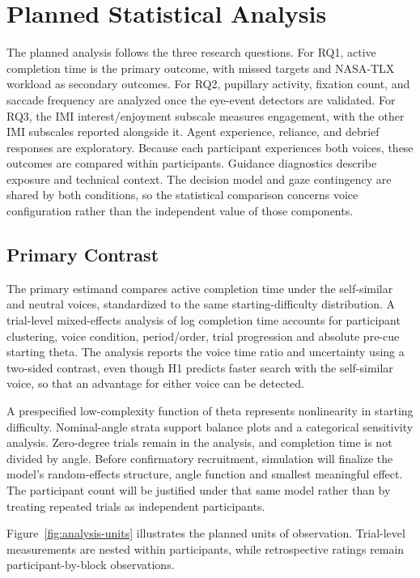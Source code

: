 
\section{Planned Statistical Analysis}
\label{ch:analysis}
The planned analysis follows the three research questions. For RQ1, active completion time is the primary outcome, with missed targets and NASA-TLX workload as secondary outcomes. For RQ2, pupillary activity, fixation count, and saccade frequency are analyzed once the eye-event detectors are validated. For RQ3, the IMI interest/enjoyment subscale measures engagement, with the other IMI subscales reported alongside it. Agent experience, reliance, and debrief responses are exploratory. Because each participant experiences both voices, these outcomes are compared within participants. Guidance diagnostics describe exposure and technical context. The decision model and gaze contingency are shared by both conditions, so the statistical comparison concerns voice configuration rather than the independent value of those components.

\subsection{Primary Contrast}
The primary estimand compares active completion time under the self-similar and neutral voices, standardized to the same starting-difficulty distribution. A trial-level mixed-effects analysis of log completion time accounts for participant clustering, voice condition, period/order, trial progression and absolute pre-cue starting theta. The analysis reports the voice time ratio and uncertainty using a two-sided contrast, even though H1 predicts faster search with the self-similar voice, so that an advantage for either voice can be detected.

A prespecified low-complexity function of theta represents nonlinearity in starting difficulty. Nominal-angle strata support balance plots and a categorical sensitivity analysis. Zero-degree trials remain in the analysis, and completion time is not divided by angle. Before confirmatory recruitment, simulation will finalize the model's random-effects structure, angle function and smallest meaningful effect. The participant count will be justified under that same model rather than by treating repeated trials as independent participants.

Figure~\ref{fig:analysis-units} illustrates the planned units of observation. Trial-level measurements are nested within participants, while retrospective ratings remain participant-by-block observations.

